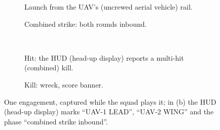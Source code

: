\begin{figure}[htbp]
\centering
\begin{subfigure}[t]{0.49\linewidth}\caption{Launch from the UAV's (uncrewed aerial vehicle) rail.}\end{subfigure}\hfill
\begin{subfigure}[t]{0.49\linewidth}\caption{Combined strike: both rounds inbound.}\end{subfigure}\\[1mm]
\begin{subfigure}[t]{0.49\linewidth}\caption{Hit: the HUD (head-up display) reports a multi-hit (combined) kill.}\end{subfigure}\hfill
\begin{subfigure}[t]{0.49\linewidth}\caption{Kill: wreck, score banner.}\end{subfigure}
\caption{One engagement, captured while the squad plays it; in (b) the HUD (head-up display) marks ``UAV-1 LEAD'', ``UAV-2 WING'' and
the phase ``combined strike inbound''.}
\label{fig:engage}
\end{figure}


